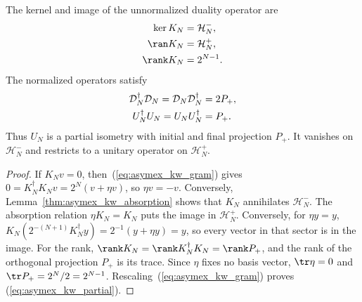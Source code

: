 \begin{lemma}
    \label{lem:asymex_kw_sectors}
    \leanok
    The kernel and image of the unnormalized duality operator are
    \begin{align}
        \ker K_N  & =\mathcal H_N^-,
        \notag                       \\
        \ran K_N  & =\mathcal H_N^+,
        \notag                       \\
        \rank K_N & =2^{N-1}.
        \label{eq:asymex_kw_sectors}
    \end{align}
    The normalized operators satisfy
    \begin{align}
        \mathcal D_N^\dagger\mathcal D_N
        =\mathcal D_N\mathcal D_N^\dagger & =2P_+,
        \notag                                     \\
        U_N^\dagger U_N=U_NU_N^\dagger    & =P_+.
        \label{eq:asymex_kw_partial}
    \end{align}
    Thus $U_N$ is a partial isometry with initial and final projection
    $P_+$. It vanishes on $\mathcal H_N^-$ and restricts to a unitary
    operator on $\mathcal H_N^+$.
\end{lemma}

\begin{proof}
    \leanok
    If $K_Nv=0$, then~(\ref{eq:asymex_kw_gram}) gives
    $0=K_N^\dagger K_Nv=2^N(v+\eta v)$, so $\eta v=-v$. Conversely,
    Lemma~\ref{thm:asymex_kw_absorption} shows that $K_N$ annihilates
    $\mathcal H_N^-$. The absorption relation $\eta K_N=K_N$ puts the
    image in $\mathcal H_N^+$. Conversely, for $\eta y=y$,
    $K_N(2^{-(N+1)}K_N^\dagger y)=2^{-1}(y+\eta y)=y$, so every vector in
    that sector is in the image. For the rank, $\rank K_N=\rank
        K_N^\dagger K_N=\rank P_+$, and the rank of the orthogonal
    projection $P_+$ is its trace. Since $\eta$ fixes no basis vector,
    $\tr\eta=0$ and $\tr P_+=2^N/2=2^{N-1}$.
    Rescaling~(\ref{eq:asymex_kw_gram}) proves
    (\ref{eq:asymex_kw_partial}).
\end{proof}

